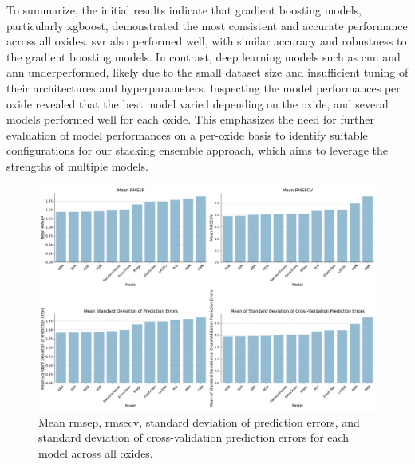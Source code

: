 To summarize, the initial results indicate that gradient boosting models, particularly \gls{xgboost}, demonstrated the most consistent and accurate performance across all oxides.
\gls{svr} also performed well, with similar accuracy and robustness to the gradient boosting models.
In contrast, deep learning models such as \gls{cnn} and \gls{ann} underperformed, likely due to the small dataset size and insufficient tuning of their architectures and hyperparameters.
Inspecting the model performances per oxide revealed that the best model varied depending on the oxide, and several models performed well for each oxide.
This emphasizes the need for further evaluation of model performances on a per-oxide basis to identify suitable configurations for our stacking ensemble approach, which aims to leverage the strengths of multiple models.

\begin{figure}[h]
    \centering
    \includegraphics[width=\textwidth]{images/init_results_means.png}
    \caption{Mean \gls{rmsep}, \gls{rmsecv}, standard deviation of prediction errors, and standard deviation of cross-validation prediction errors for each model across all oxides.}
    \label{fig:init_results_rmses}
\end{figure}

